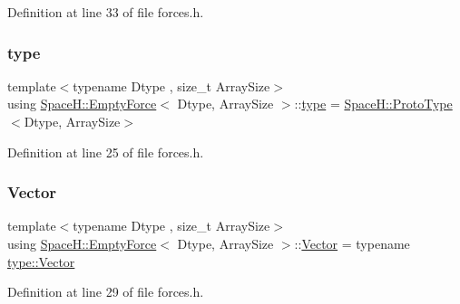 Definition at line 33 of file forces.\+h.

\mbox{\label{struct_space_h_1_1_empty_force_a87b62085a73d95239597b9e88ff5e32a}} 
\subsubsection{\texorpdfstring{type}{type}}
{\footnotesize\ttfamily template$<$typename Dtype , size\+\_\+t Array\+Size$>$ \\
using \mbox{\hyperlink{struct_space_h_1_1_empty_force}{Space\+H\+::\+Empty\+Force}}$<$ Dtype, Array\+Size $>$\+::\mbox{\hyperlink{struct_space_h_1_1_empty_force_a87b62085a73d95239597b9e88ff5e32a}{type}} =  \mbox{\hyperlink{struct_space_h_1_1_proto_type}{Space\+H\+::\+Proto\+Type}}$<$Dtype, Array\+Size$>$}



Definition at line 25 of file forces.\+h.

\mbox{\label{struct_space_h_1_1_empty_force_abfd8a2b724383a3a2dde191d95ca0661}} 
\subsubsection{\texorpdfstring{Vector}{Vector}}
{\footnotesize\ttfamily template$<$typename Dtype , size\+\_\+t Array\+Size$>$ \\
using \mbox{\hyperlink{struct_space_h_1_1_empty_force}{Space\+H\+::\+Empty\+Force}}$<$ Dtype, Array\+Size $>$\+::\mbox{\hyperlink{struct_space_h_1_1_empty_force_abfd8a2b724383a3a2dde191d95ca0661}{Vector}} =  typename \mbox{\hyperlink{struct_space_h_1_1_proto_type_a316b81f4660b2b4fab14a8e1f23b6089}{type\+::\+Vector}}}



Definition at line 29 of file forces.\+h.

\mbox{\label{struct_space_h_1_1_empty_force_a06ad868879a6fa5def9c7f9fd75fffde}} 
